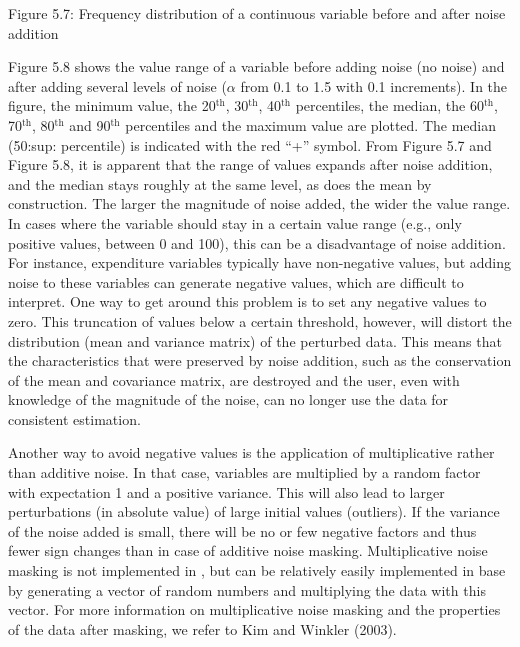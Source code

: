 \documentclass[letterpaper,10pt,english]{sphinxmanual}
\begin{document}
\noindent{}

Figure 5.7: Frequency distribution of a continuous variable before and
after noise addition

Figure 5.8 shows the value range of a variable before adding noise (no
noise) and after adding several levels of noise (\(\alpha\) from 0.1
to 1.5 with 0.1 increments). In the figure, the minimum value, the
20$^{\text{th}}$, 30$^{\text{th}}$, 40$^{\text{th}}$ percentiles, the median, the
60$^{\text{th}}$, 70$^{\text{th}}$, 80$^{\text{th}}$ and 90$^{\text{th}}$
percentiles and the maximum value are plotted. The median (50:sup:
percentile) is indicated with the red “+” symbol. From Figure 5.7 and
Figure 5.8, it is apparent that the range of values expands after noise
addition, and the median stays roughly at the same level, as does the
mean by construction. The larger the magnitude of noise added, the wider
the value range. In cases where the variable should stay in a certain
value range (e.g., only positive values, between 0 and 100), this can be
a disadvantage of noise addition. For instance, expenditure variables
typically have non-negative values, but adding noise to these variables
can generate negative values, which are difficult to interpret. One way
to get around this problem is to set any negative values to zero. This
truncation of values below a certain threshold, however, will distort
the distribution (mean and variance matrix) of the perturbed data. This
means that the characteristics that were preserved by noise addition,
such as the conservation of the mean and covariance matrix, are
destroyed and the user, even with knowledge of the magnitude of the
noise, can no longer use the data for consistent estimation.

Another way to avoid negative values is the application of
multiplicative rather than additive noise. In that case, variables are
multiplied by a random factor with expectation 1 and a positive
variance. This will also lead to larger perturbations (in absolute
value) of large initial values (outliers). If the variance of the noise
added is small, there will be no or few negative factors and thus fewer
sign changes than in case of additive noise masking. Multiplicative
noise masking is not implemented in , but can be relatively
easily implemented in base  by generating a vector of random numbers
and multiplying the data with this vector. For more information on
multiplicative noise masking and the properties of the data after
masking, we refer to Kim and Winkler (2003).
\end{document}
